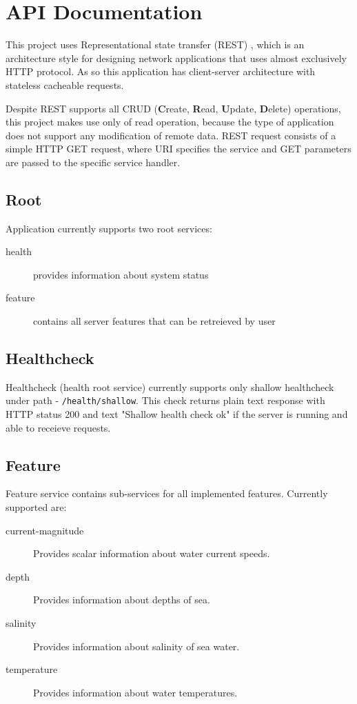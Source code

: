 \documentclass[11pt,a4paper,titlepage,oneside]{report}
\begin{document}
\appendix
\printglossary[type=\acronymtype]
\printglossary
\chapter{API Documentation}
This project uses Representational state transfer (REST) \cite{REST:elkstein}, which is an architecture style for designing network applications that uses almost exclusively \gls{HTTP} protocol. As so this application has client-server architecture with stateless cacheable requests.

Despite REST supports all CRUD (\textbf{C}reate, \textbf{R}ead, \textbf{U}pdate, \textbf{D}elete) operations, this project makes use only of read operation, because the type of application does not support any modification of remote data. REST request consists of a simple \gls{HTTP} GET request, where URI specifies the service and GET parameters are passed to the specific service handler. \\

\section{Root}

Application currently supports two root services:
\begin{description}
	\item[health] provides information about system status
	\item[feature] contains all server features that can be retreieved by user
\end{description}

\section{Healthcheck}

Healthcheck (health root service) currently supports only shallow healthcheck under path - \texttt{/health/shallow}. This check returns plain text response with \gls{HTTP} status 200 and text "Shallow health check ok" if the server is running and able to receieve requests. \\

\section{Feature}

Feature service contains sub-services for all implemented features. Currently supported are:
\begin{description}
	\item[current-magnitude] Provides scalar information about water current speeds.
	\item[depth] Provides information about depths of sea.
	\item[salinity] Provides information about salinity of sea water.
	\item[temperature] Provides information about water temperatures.
\end{description}
\end{document}
